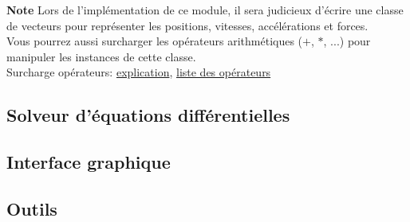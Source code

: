 \documentclass{article}
\begin{document}
\noindent\textbf{Note} Lors de l'implémentation de ce module, il sera judicieux d'écrire une classe de vecteurs pour représenter les positions, vitesses, accélérations et forces. \\
Vous pourrez aussi surcharger les opérateurs arithmétiques ($+$, $*$, ...) pour manipuler les instances de cette classe.\\
Surcharge opérateurs: \href{https://openclassrooms.com/fr/courses/235344-apprenez-a-programmer-en-python/233046-appliquez-des-methodes-speciales#/id/r-232928}{explication}, \href{https://docs.python.org/fr/3/library/operator.html}{liste des opérateurs}

\subsection{Solveur d'équations différentielles}
\label{solveur}

\subsection{Interface graphique}
\label{interface}

\subsection{Outils}
\label{outils}
\end{document}
